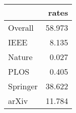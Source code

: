 \begin{tabular}{lr}
\toprule
{} &   rates \\
\midrule
Overall  &  58.973 \\
IEEE     &   8.135 \\
Nature   &   0.027 \\
PLOS     &   0.405 \\
Springer &  38.622 \\
arXiv    &  11.784 \\
\bottomrule
\end{tabular}
